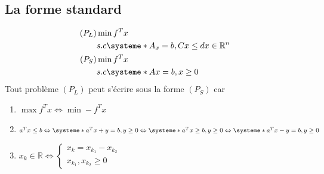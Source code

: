 \documentclass{article}
\theoremstyle{plain}%
\theoremstyle{definition}
\theoremstyle{remark}
\begin{document}
\subsection{La forme standard}
\begin{align*}
    (P_L) &\min f^Tx \\
        & s.c \systeme*{
            A_x = b,
            C x \leq d
            x \in \mathbb{R}^n
        } \\
    (P_S) &\min f^T x \\
        & s.c \systeme*{
            Ax = b,
            x \geq 0
        }
\end{align*}
Tout problème $ (P_L) $ peut s'écrire sous la forme $ (P_S) $ car
\begin{enumerate}
    \item $ \max f^T x \Leftrightarrow \min -f^Tx $ 
    \item $ a^Tx \leq b \Leftrightarrow \systeme*{a^Tx + y = b, y \geq 0} \Leftrightarrow \systeme*{a^Tx \geq b, y \geq 0} \Leftrightarrow \systeme*{a^Tx - y = b, y \geq 0}$ 
    \item $ x_k \in \mathbb{R} \Leftrightarrow
    \begin{cases} x_k = x_{k_1} - x_{k_2} \\ x_{k_1}, x_{k_2} \geq 0 \end{cases}$
\end{enumerate}
\end{document}
